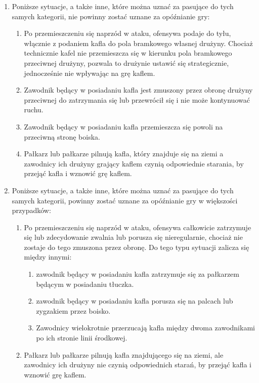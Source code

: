 \documentclass[12pt]{article}
\begin{document}
\begin{enumerate}
  \item Poniższe sytuacje, a także inne, które można uznać za pasujące do
tych samych kategorii, nie powinny zostać uznane za opóźnianie gry:

  \begin{enumerate}
    \item  Po przemieszczeniu się naprzód w ataku, ofensywa podaje do tyłu,
włącznie z podaniem kafla do pola bramkowego własnej drużyny. Chociaż
technicznie kafel nie przemieszcza się w kierunku pola bramkowego
przeciwnej drużyny, pozwala to drużynie ustawić się strategicznie,
jednocześnie nie wpływając na grę kaflem.

\item Zawodnik będący w posiadaniu kafla jest zmuszony przez obronę
drużyny przeciwnej do zatrzymania się lub przewrócił się i nie może
kontynuować ruchu.

\item Zawodnik będący w posiadaniu kafla przemieszcza się powoli na
przeciwną stronę boiska.

\item Pałkarz lub pałkarze pilnują kafla, który znajduje się na ziemi a
zawodnicy ich drużyny grający kaflem czynią odpowiednie starania, by
przejąć kafla i wznowić grę kaflem.
\end{enumerate}
\item Poniższe sytuacje, a także inne, które można uznać za pasujące do
tych samych kategorii, powinny zostać uznane za opóźnianie gry w
większości przypadków:
\begin{enumerate}
\item Po przemieszczeniu się naprzód w ataku, ofensywa całkowicie
zatrzymuje się lub zdecydowanie zwalnia lub porusza się nieregularnie,
chociaż nie zostaje do tego zmuszona przez obronę. Do tego typu sytuacji
zalicza się między innymi:

\begin{enumerate}
\item
    zawodnik będący w posiadaniu kafla zatrzymuje się za pałkarzem będącym
  w posiadaniu tłuczka.
  \item
    zawodnik będący w posiadaniu kafla porusza się na palcach lub
  zygzakiem przez boisko.
  \item
    Zawodnicy wielokrotnie przerzucają kafla między dwoma zawodnikami po
  ich stronie linii środkowej.
  \end{enumerate}

\item Pałkarz lub pałkarze pilnują kafla znajdującego się na ziemi, ale
zawodnicy ich drużyny nie czynią odpowiednich starań, by przejąć kafla i
wznowić grę kaflem.
\end{enumerate}


\end{enumerate}
\end{document}
